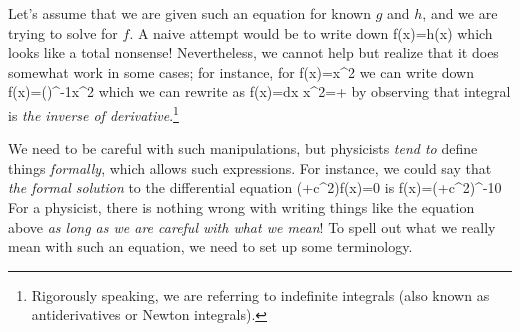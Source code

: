 Let's assume that we are given such an equation for known $g$ and $h$, and we are trying to solve for $f$. A naive attempt would be to write down
\be 
f(x)=h(x)
\ee 
which looks like a total nonsense! Nevertheless, we cannot help but realize that it does somewhat work in some cases; for instance, for
\be 
{}f(x)=x^2
\ee 
we can write down
\be 
f(x)=\left(\right)^{-1}x^2
\ee 
which we can rewrite as 
\be 
f(x)=\int dx x^2=+
\ee 
by observing that integral is \emph{the inverse of derivative}.\footnote{Rigorously speaking, we are referring to indefinite integrals (also known as antiderivatives or Newton integrals).}

We need to be careful with such manipulations, but physicists \emph{tend to} define things \emph{formally}, which allows such expressions. For instance, we could say that \emph{the formal solution} to the differential equation
\be 
\left(+c^2\right)f(x)=0
\ee 
is
\be 
f(x)=\left(+c^2\right)^{-1}0
\ee 
For a physicist, there is nothing wrong with writing things like the equation above \emph{as long as we are careful with what we mean}! To spell out what we really mean with such an equation, we need to set up some terminology.

